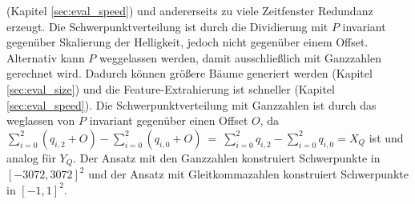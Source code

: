 (Kapitel \ref{sec:eval_speed}) und andererseits zu viele Zeitfenster Redundanz erzeugt.
\newline
\newline
Die Schwerpunktverteilung ist durch die Dividierung mit $P$ invariant gegenüber Skalierung der Helligkeit, jedoch nicht gegenüber einem Offset. Alternativ kann $P$ weggelassen werden, damit ausschließlich
mit Ganzzahlen gerechnet wird. Dadurch können größere Bäume generiert werden (Kapitel \ref{sec:eval_size}) und die Feature-Extrahierung ist schneller (Kapitel \ref{sec:eval_speed}). Die Schwerpunktverteilung
mit Ganzzahlen ist durch das weglassen von $P$ invariant gegenüber einen Offset $O$, da $\sum_{i=0}^{2}(q_{i,2} + O) - \sum_{i=0}^{2}(q_{i,0} + O)\ =\ \sum_{i=0}^{2} q_{i,2} - \sum_{i=0}^{2} q_{i,0} = X_Q$
ist und analog für $Y_Q$. Der Ansatz mit den Ganzzahlen konstruiert Schwerpunkte in $[-3072, 3072]^2$ und der Ansatz mit Gleitkommazahlen konstruiert Schwerpunkte in $[-1, 1]^2$.
